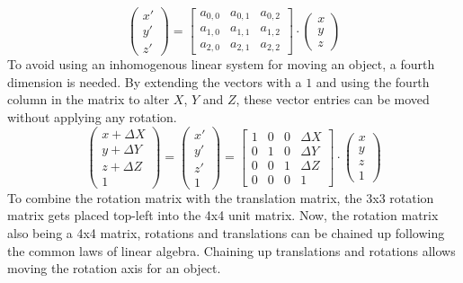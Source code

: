 \begin{equation*}
    \begin{pmatrix}
        x' \\
        y' \\
        z'
    \end{pmatrix}
    =
    \begin{bmatrix}
        a_{0,0} & a_{0,1} & a_{0,2} \\
        a_{1,0} & a_{1,1} & a_{1,2} \\
        a_{2,0} & a_{2,1} & a_{2,2}
    \end{bmatrix}
    \cdot
    \begin{pmatrix}
        x \\
        y \\
        z
    \end{pmatrix}
\end{equation*}
To avoid using an inhomogenous linear system for moving an object, a fourth dimension is needed. By extending the vectors with a $1$ and using the fourth column in the matrix to alter $X$, $Y$ and $Z$, these vector entries can be moved without applying any rotation.
\begin{equation*}
    \begin{pmatrix}
        x+\Delta X \\
        y+\Delta Y \\
        z+\Delta Z \\
        1
    \end{pmatrix}
    =
    \begin{pmatrix}
        x' \\
        y' \\
        z' \\
        1
    \end{pmatrix}
    =
    \begin{bmatrix}
        1 & 0 & 0 & \Delta X \\
        0 & 1 & 0 & \Delta Y \\
        0 & 0 & 1 & \Delta Z \\
        0 & 0 & 0 & 1
    \end{bmatrix}
    \cdot
    \begin{pmatrix}
        x \\
        y \\
        z \\
        1
    \end{pmatrix}
\end{equation*}
To combine the rotation matrix with the translation matrix, the 3x3 rotation matrix gets placed top-left into the 4x4 unit matrix. Now, the rotation matrix also being a 4x4 matrix, rotations and translations can be chained up following the common laws of linear algebra. Chaining up translations and rotations allows moving the rotation axis for an object.
